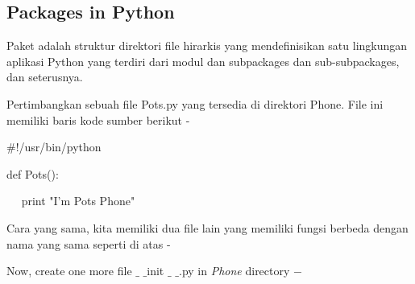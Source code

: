 \documentclass[a4paper,12pt]{report}
\begin{document}
\subsection*{Packages in Python}
 \par
\begin{adjustwidth}{0.03in}{0.03in}
Paket adalah struktur direktori file hirarkis yang mendefinisikan satu lingkungan aplikasi Python yang terdiri dari modul dan subpackages dan sub-subpackages, dan seterusnya.\end{adjustwidth}
 \par
\begin{adjustwidth}{0.03in}{0.03in}
Pertimbangkan sebuah file Pots.py yang tersedia di direktori Phone. File ini memiliki baris kode sumber berikut -\end{adjustwidth}
 \par
\noindent 
 \hspace*{0.5in}  $  \#  $!/usr/bin/python \par
\vspace{12pt}
\noindent 
 \hspace*{0.5in} def Pots(): \par
\noindent 
 \hspace*{0.5in} ~~ print "I'm Pots Phone" \par
\begin{adjustwidth}{0.03in}{0.03in}
Cara yang sama, kita memiliki dua file lain yang memiliki fungsi berbeda dengan nama yang sama seperti di atas -\end{adjustwidth}
 \par
\begin{adjustwidth}{0.53in}{0.03in}
\end{adjustwidth}
 \par
\vspace{10pt}
\begin{adjustwidth}{0.03in}{0.03in}
Now, create one more file  $  \_  $ $  \_  $init $  \_  $ $  \_  $.py in $  $\textit{Phone} $  $directory  $ - $\end{adjustwidth}
\end{document}
